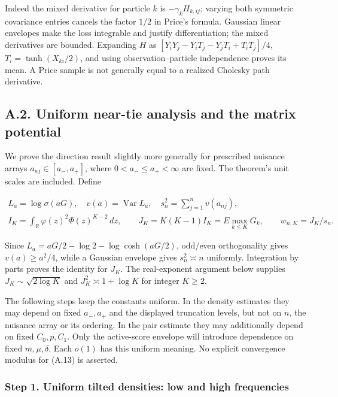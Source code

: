 \documentclass{article}
\begin{document}
Indeed the mixed derivative for particle \(k\) is \(-\gamma_kH_{k,ij}\);
varying both symmetric covariance entries cancels the factor \(1/2\) in
Price's formula. Gaussian linear envelopes make the loss integrable and
justify differentiation; the mixed derivatives are bounded. Expanding
\(H\) as \([Y_iY_j-Y_iT_j-Y_jT_i+T_iT_j]/4\), \(T_i=\tanh(X_{ki}/2)\),
and using observation--particle independence proves its mean. A Price
sample is not generally equal to a realized Cholesky path derivative.

\subsection*{A.2. Uniform near-tie analysis and the matrix
potential}\label{a.2.-uniform-near-tie-analysis-and-the-matrix-potential}

We prove the direction result slightly more generally for prescribed
nuisance arrays \(a_{nj}\in[a_-,a_+]\), where \(0<a_-\le a_+<\infty\)
are fixed. The theorem's unit scales are included. Define

\[
\begin{gathered}
L_a=\log\sigma(aG),\quad v(a)=\operatorname{Var}L_a,\quad
s_n^2=\sum_{j=1}^nv(a_{nj}),\\
I_K=\int_{\mathbb R}\varphi(z)^2\Phi(z)^{K-2}\,dz,\qquad
J_K=K(K-1)I_K=E\max_{k\le K}G_k,\qquad w_{n,K}=J_K/s_n .
\end{gathered}
\tag{A.6}
\]

Since \(L_a=aG/2-\log2-\log\cosh(aG/2)\), odd/even orthogonality gives
\(v(a)\ge a^2/4\), while a Gaussian envelope gives \(s_n^2\asymp n\)
uniformly. Integration by parts proves the identity for \(J_K\). The
real-exponent argument below supplies \(J_K\sim\sqrt{2\log K}\) and
\(J_K^2\asymp1+\log K\) for integer \(K\ge2\).

The following steps keep the constants uniform. In the density estimates
they may depend on fixed \(a_-,a_+\) and the displayed truncation
levels, but not on \(n\), the nuisance array or its ordering. In the
pair estimate they may additionally depend on fixed \(C_0,p,C_1\). Only
the active-score envelope will introduce dependence on fixed
\(m,\mu,\delta\). Each \(o(1)\) has this uniform meaning. No explicit
convergence modulus for (A.13) is asserted.

\subsubsection*{Step 1. Uniform tilted densities: low and high
frequencies}\label{step-1.-uniform-tilted-densities-low-and-high-frequencies}
\end{document}
